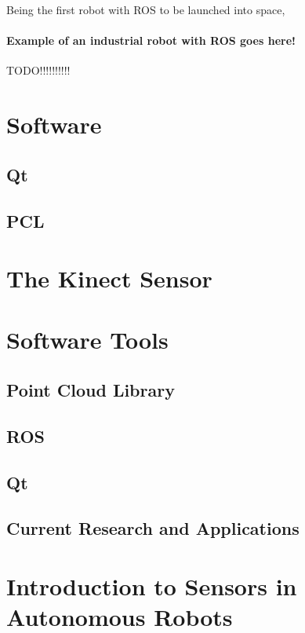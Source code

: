Being the first robot with \ac{ROS} to be launched into space, 

\paragraph{Example of an industrial robot with ROS goes here!}

TODO!!!!!!!!!!

\section{Software}

\subsection{Qt}

\subsection{PCL}

\section{The Kinect Sensor}

\section{Software Tools}

\subsection{Point Cloud Library}

\subsection{ROS}

\subsection{Qt}


\subsection{Current Research and Applications}

\section{Introduction to Sensors in Autonomous Robots}

